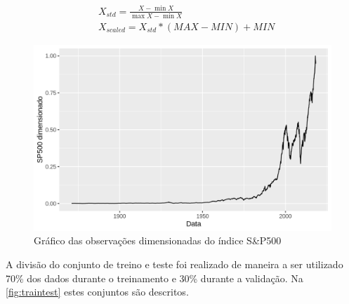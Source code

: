\documentclass[
    12pt,
    oneside,
    a4paper,
    english,
    brazil
]{abntex2}
\begin{document}
\begin{equation}
    \begin{split}\label{eq:minmaxscaler}
        &X_{std} = \frac{X - \min X}{\max X-\min X}\\
        &X_{scaled} = X_{std} * (MAX-MIN)+MIN
    \end{split}
\end{equation}

\begin{figure}[ht]
    \centering
    \caption{Gráfico das observações dimensionadas do índice S\&P500}\label{fig:sp500}
    \includegraphics[width=.5\linewidth]{images/SP500.png}
\end{figure}

A  divisão do  conjunto  de treino  e  teste  foi realizado  de  maneira a  ser
utilizado 70\% dos  dados durante o treinamento e 30\%  durante a validação. Na
\autoref{fig:traintest} estes conjuntos são descritos.
\end{document}
